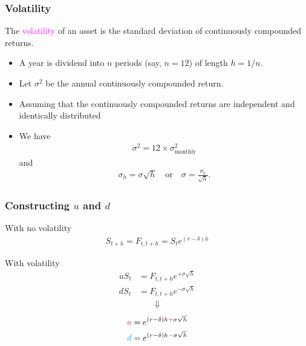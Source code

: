 \begin{frame}[fragile,t]
	\frametitle{Volatility}
	The \textcolor{magenta}{volatility}	of an asset is the standard deviation of continuously
	compounded returns.
	\bigskip

	\begin{itemize}
		\item A year is dividend  into $n$ periods (say,  $n=12$) of length $h=1/n$.
		\item Let $\sigma^2$ be the annual continuously compounded return.
		\item Assuming that the continuously compounded returns are independent and identically
			distributed
		\item We have
			 \begin{align*}
				 \sigma^2 = 12 \times \sigma^2_{\text{monthly}}
			\end{align*}
			and
			\begin{align*}
				\sigma_h = \sigma \sqrt{h} \quad \text{or} \quad \sigma= \frac{\sigma_h}{\sqrt{h}}.
			\end{align*}
	\end{itemize}
\end{frame}
\begin{frame}[fragile,t]
	\frametitle{Constructing $u$ and $d$}
	\begin{center}
		With no volatility
		\begin{align*}
			S_{t+h} = F_{t,t+h} = S_t e^{(r-\delta)h}
		\end{align*}

		\mySeparateLine

		With volatility
		\begin{align*}
			u S_t &= F_{t,t+h} e^{+\sigma \sqrt{h}} \\
			d S_t &= F_{t,t+h} e^{-\sigma \sqrt{h}}
		\end{align*}
		\begin{align*}
			\Downarrow
		\end{align*}
		\begin{align*}
			\textcolor{magenta}{u} & = e^{(r-\delta)h \textcolor{magenta}{+} \sigma \sqrt{h}} \\
			\textcolor{cyan}{d}    & = e^{(r-\delta)h \textcolor{cyan}{-} \sigma \sqrt{h}}
		\end{align*}
	\end{center}
\end{frame}
